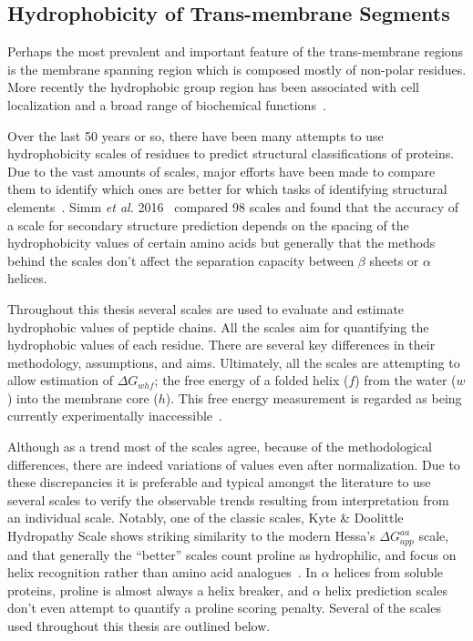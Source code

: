 \subsection{Hydrophobicity of Trans-membrane Segments}\label{ssection:hydrophobicityscales}

Perhaps the most prevalent and important feature of the trans-membrane regions is the membrane spanning region which is composed mostly of non-polar residues. More recently the hydrophobic group region has been associated with cell localization and a broad range of biochemical functions~\cite{Junne2010, Wong2012}.

Over the last 50 years or so, there have been many attempts to use hydrophobicity scales of residues to predict structural classifications of proteins. Due to the vast amounts of scales, major efforts have been made to compare them to identify which ones are better for which tasks of identifying structural elements~\cite{Simm2016, Peters2014}. Simm \textit{ et al.} 2016~\cite{Simm2016} compared 98 scales and found that the accuracy of a scale for secondary structure prediction depends on the spacing of the hydrophobicity values of certain amino acids but generally that the methods behind the scales don't affect the separation capacity between $ \beta $ sheets or $ \alpha $ helices.

Throughout this thesis several scales are used to evaluate and estimate hydrophobic values of peptide chains. All the scales aim for quantifying the hydrophobic values of each residue. There are several key differences in their methodology, assumptions, and aims. Ultimately, all the scales are attempting to allow estimation of ${\Delta G}_{whf}$; the free energy of a folded helix ($ f $) from the water ($w$) into the membrane core ($h$). This free energy measurement is regarded as being currently experimentally inaccessible~\cite{Cymer2014}.

Although as a trend most of the scales agree, because of the methodological differences, there are indeed variations of values even after normalization. Due to these discrepancies it is preferable and typical amongst the literature to use several scales to verify the observable trends resulting from interpretation from an individual scale. Notably, one of the classic scales, Kyte \& Doolittle Hydropathy Scale shows striking similarity to the modern Hessa's ${\Delta G}_{app}^{aa}$ scale, and that generally the ``better'' scales count proline as hydrophilic, and focus on helix recognition rather than amino acid analogues~\cite{Peters2014}. In $\alpha$ helices from soluble proteins, proline is almost always a helix breaker, and $\alpha$ helix prediction scales don't even attempt to quantify a proline scoring penalty. Several of the scales used throughout this thesis are outlined below.

